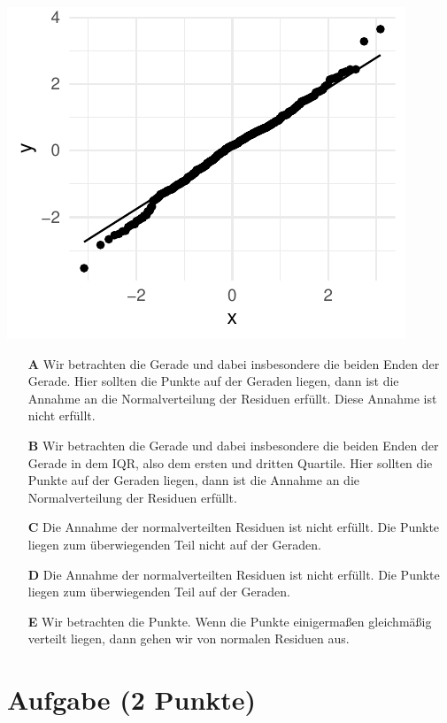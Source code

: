 \documentclass[a4paper, 9pt]{scrartcl}\usepackage[]{graphicx}\usepackage[]{xcolor}
\makeatletter
\def\maxwidth{ %
  \ifdim\Gin@nat@width>\linewidth
    \linewidth
  \else
    \Gin@nat@width
  \fi
}
\makeatother
\begin{document}
{\centering \includegraphics[width=\maxwidth]{img/mc-regression-05-a-1} 

}







\begin{enumerate}
\item [\textbf{A} \msquare] Wir betrachten die Gerade und dabei insbesondere die beiden Enden der Gerade. Hier sollten die Punkte auf der Geraden liegen, dann ist die Annahme an die Normalverteilung der Residuen erfüllt. Diese Annahme ist nicht erfüllt.
\item [\textbf{B} \msquare] Wir betrachten die Gerade und dabei insbesondere die beiden Enden der Gerade in dem IQR, also dem ersten und dritten Quartile. Hier sollten die Punkte auf der Geraden liegen, dann ist die Annahme an die Normalverteilung der Residuen erfüllt.
\item [\textbf{C} \msquare] Die Annahme der normalverteilten Residuen ist nicht erfüllt. Die Punkte liegen zum überwiegenden Teil nicht auf der Geraden.
\item [\textbf{D} \msquare] Die Annahme der normalverteilten Residuen ist nicht erfüllt. Die Punkte liegen zum überwiegenden Teil auf der Geraden.
\item [\textbf{E} \msquare] Wir betrachten die Punkte. Wenn die Punkte einigermaßen gleichmäßig verteilt liegen, dann gehen wir von normalen Residuen aus.
\end{enumerate}

\section{Aufgabe \hfill (2 Punkte)}
\end{document}

